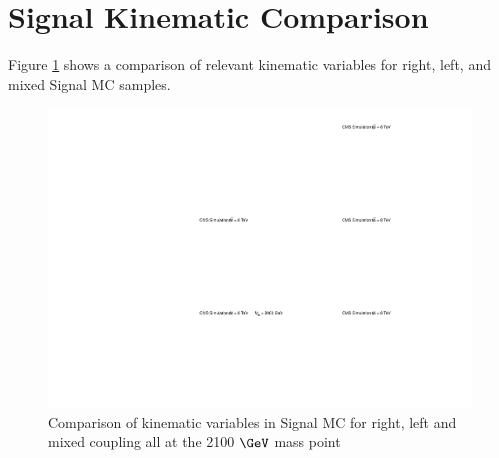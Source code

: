 \section{Signal Kinematic Comparison}
\label{sec:SigKinGen}
Figure \ref{figs:genkin} shows a comparison of relevant kinematic variables for right, left, and mixed Signal MC samples.


\begin{figure}[Htcb]
\centering
\includegraphics[width=1.0\textwidth]{figs/CutCompqcdandsignalGencoupling.pdf}
\caption{Comparison of kinematic variables in Signal MC for right, left and mixed coupling all at the 2100$~\GeV$ mass point }
\label{figs:genkin}
\end{figure}





